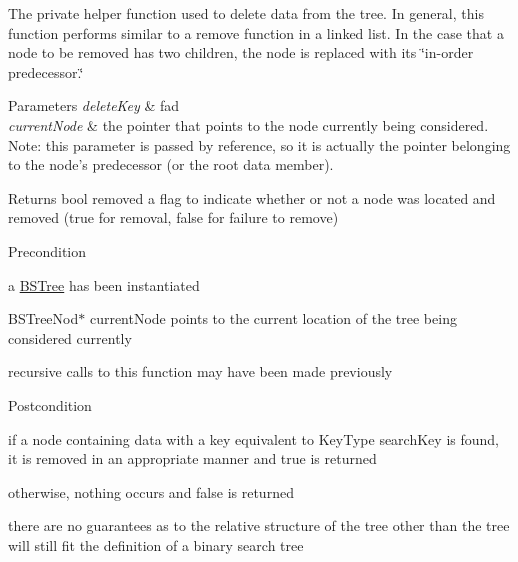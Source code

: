 \-The private helper function used to delete data from the tree. \-In general, this function performs similar to a remove function in a linked list. \-In the case that a node to be removed has two children, the node is replaced with its \char`\"{}in-\/order predecessor.\char`\"{}


\begin{DoxyParams}{\-Parameters}
{\em delete\-Key} & fad \\
\hline
{\em current\-Node} & the pointer that points to the node currently being considered. \-Note\-: this parameter is passed by reference, so it is actually the pointer belonging to the node's predecessor (or the root data member).\\
\hline
\end{DoxyParams}
\begin{DoxyReturn}{\-Returns}
bool removed a flag to indicate whether or not a node was located and removed (true for removal, false for failure to remove)
\end{DoxyReturn}
\begin{DoxyPrecond}{\-Precondition}

\begin{DoxyEnumerate}
\item a \hyperlink{class_b_s_tree}{\-B\-S\-Tree} has been instantiated
\item \-B\-S\-Tree\-Nod$\ast$ current\-Node points to the current location of the tree being considered currently
\item recursive calls to this function may have been made previously
\end{DoxyEnumerate}
\end{DoxyPrecond}
\begin{DoxyPostcond}{\-Postcondition}

\begin{DoxyEnumerate}
\item if a node containing data with a key equivalent to \-Key\-Type search\-Key is found, it is removed in an appropriate manner and true is returned
\item otherwise, nothing occurs and false is returned
\item there are no guarantees as to the relative structure of the tree other than the tree will still fit the definition of a binary search tree
\end{DoxyEnumerate}
\end{DoxyPostcond}

